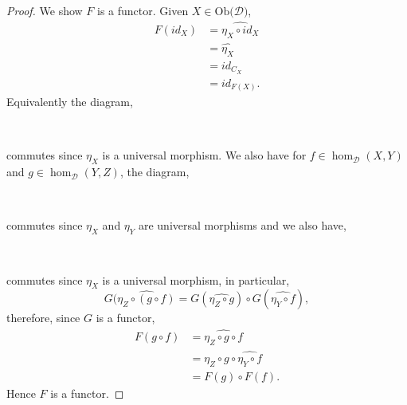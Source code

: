 \documentclass[11pt,a4paper]{article}
\theoremstyle{definition}
\newcommand\ho[3][]{\hom_{#1}(#2,#3)}
\newcommand\ob[1]{\mathrm{Ob(}#1\mathrm{)}}
\newcommand\cat[1]{\mathscr{#1}}
\numberwithin{equation}{section}
\begin{document}
\begin{proof}
We show $F$ is a functor. Given $X\in\ob{\cat{D}}$,
\begin{align*}
    F(id_{X}) &= \widehat{\eta_{X} \circ id_{X}}\\
    &= \hat{\eta_{X}}\\
    &= id_{C_{X}}\\
    &= id_{F(X)}.
\end{align*}
Equivalently the diagram,
\begin{center}
    \\
    \end{center}
commutes since $\eta_{X}$ is a universal morphism.
We also have for $f\in\ho[\cat{D}]{X}{Y}$ and $g\in\ho[\cat{D}]{Y}{Z}$, the diagram,
\begin{center}
    \\
    \end{center}
commutes since $\eta_{X}$ and $\eta_{Y}$ are universal morphisms and we also have,
\begin{center}
    \\
    \end{center}
commutes since $\eta_{X}$ is a universal morphism, in particular,
\[G(\widehat{\eta_{Z}\circ(g\circ f)} = G(\widehat{\eta_{Z}\circ g}) \circ G(\widehat{\eta_{Y}\circ f}),\]
therefore, since $G$ is a functor,
\begin{align*}
    F(g\circ f) &= \widehat{\eta_{Z} \circ g\circ f} \\
    &= \widehat{\eta_{Z}\circ g} \circ \widehat{\eta_{Y}\circ f}\\
    &= F(g)\circ F(f).
\end{align*}
Hence $F$ is a functor.


\end{proof}
\end{document}
